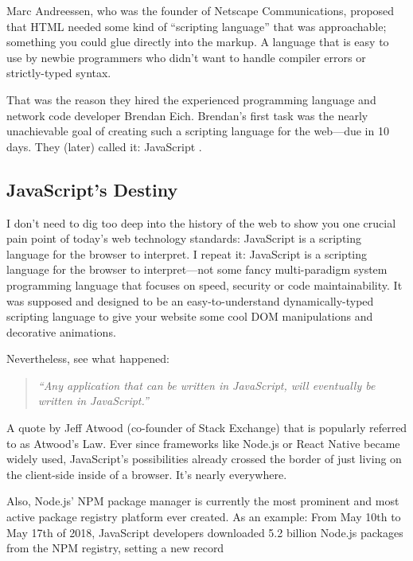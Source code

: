 \documentclass[10pt]{article}  %
\begin{document}
\begin{sloppypar}
  Marc Andreessen, who was the founder of Netscape Communications, proposed that HTML needed some kind of “scripting language” that was approachable; something you could glue directly into the markup. A language that is easy to use by newbie programmers who didn’t want to handle compiler errors or strictly-typed syntax.

  That was the reason they hired the experienced programming language and network code developer Brendan Eich. Brendan’s first task was the nearly unachievable goal of creating such a scripting language for the web—due in 10 days. They (later) called it: JavaScript \citep{severance_javascript_2012}.

  \subsection{JavaScript’s Destiny}
  \label{sec:javascript-destiny}

  I don’t need to dig too deep into the history of the web to show you one crucial pain point of today’s web technology standards: JavaScript is a scripting language for the browser to interpret. I repeat it: JavaScript is a scripting language for the browser to interpret—not some fancy multi-paradigm system programming language that focuses on speed, security or code maintainability. It was supposed and designed to be an easy-to-understand dynamically-typed scripting language to give your website some cool DOM manipulations and decorative animations.

  Nevertheless, see what happened:

  \begin{quote}
    \emph{``Any application that can be written in JavaScript, will eventually be written in JavaScript.'' \citep{atwood_principle_2007}}
  \end{quote}

  A quote by Jeff Atwood (co-founder of Stack Exchange) that is popularly referred to as Atwood’s Law. Ever since frameworks like Node.js or React Native became widely used, JavaScript’s possibilities already crossed the border of just living on the client-side inside of a browser. It’s nearly everywhere.

  Also, Node.js’ NPM package manager is currently the most prominent and most active package registry platform ever created. As an example: From May 10th to May 17th of 2018, JavaScript developers downloaded 5.2 billion Node.js packages from the NPM registry, setting a new record \citep{inc_how_2018}


\end{sloppypar}
\end{document}
